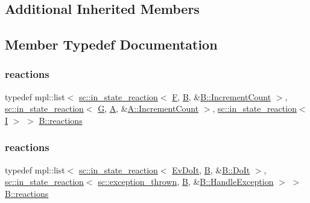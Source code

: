 \subsection*{Additional Inherited Members}


\subsection{Member Typedef Documentation}
\mbox{\label{struct_b_a29fc5ace91a2e4f1854b15b8b301e458}} 
\subsubsection{\texorpdfstring{reactions}{reactions}\hspace{0.1cm}{\footnotesize\ttfamily [1/6]}}
{\footnotesize\ttfamily typedef mpl\+::list$<$ \mbox{\hyperlink{classboost_1_1statechart_1_1in__state__reaction}{sc\+::in\+\_\+state\+\_\+reaction}}$<$ \mbox{\hyperlink{struct_f}{F}}, \mbox{\hyperlink{struct_b}{B}}, \&\mbox{\hyperlink{struct_b_a862e39288b607fcc7e71f9fa07c0cd20}{B\+::\+Increment\+Count}} $>$, \mbox{\hyperlink{classboost_1_1statechart_1_1in__state__reaction}{sc\+::in\+\_\+state\+\_\+reaction}}$<$ \mbox{\hyperlink{struct_g}{G}}, \mbox{\hyperlink{struct_a}{A}}, \&\mbox{\hyperlink{struct_a_a7811ed8883449fde0d5f59bd2ebf3de5}{A\+::\+Increment\+Count}} $>$, \mbox{\hyperlink{classboost_1_1statechart_1_1in__state__reaction}{sc\+::in\+\_\+state\+\_\+reaction}}$<$ \mbox{\hyperlink{struct_i}{I}} $>$ $>$ \mbox{\hyperlink{struct_b_a2a510c568bd4f5254e154e713bcc7724}{B\+::reactions}}}

\mbox{\label{struct_b_abbfe19dac6bb98dbb89c39caf2aa46d9}} 
\subsubsection{\texorpdfstring{reactions}{reactions}\hspace{0.1cm}{\footnotesize\ttfamily [2/6]}}
{\footnotesize\ttfamily typedef mpl\+::list$<$ \mbox{\hyperlink{classboost_1_1statechart_1_1in__state__reaction}{sc\+::in\+\_\+state\+\_\+reaction}}$<$ \mbox{\hyperlink{struct_ev_do_it}{Ev\+Do\+It}}, \mbox{\hyperlink{struct_b}{B}}, \&\mbox{\hyperlink{struct_b_ad8417b0b86326962007c13d75094330e}{B\+::\+Do\+It}} $>$, \mbox{\hyperlink{classboost_1_1statechart_1_1in__state__reaction}{sc\+::in\+\_\+state\+\_\+reaction}}$<$ \mbox{\hyperlink{classboost_1_1statechart_1_1exception__thrown}{sc\+::exception\+\_\+thrown}}, \mbox{\hyperlink{struct_b}{B}}, \&\mbox{\hyperlink{struct_b_a8eb80df2fcfde5209e4800f5aec2d7a5}{B\+::\+Handle\+Exception}} $>$ $>$ \mbox{\hyperlink{struct_b_a2a510c568bd4f5254e154e713bcc7724}{B\+::reactions}}}

